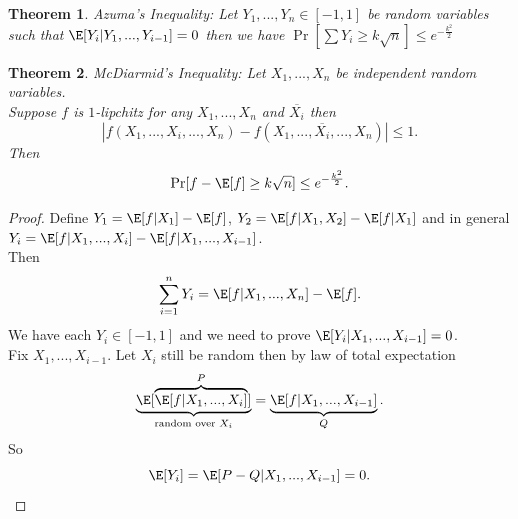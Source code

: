 \documentclass[a4paper]{article}
\newtheorem{thm}{Theorem}[section]
\begin{document}
\begin{thm}
    Azuma's Inequality: Let $Y_1,...,Y_n\in [-1,1]$ be random variables such that $\E[Y_i | Y_1,...,Y_{i-1}]=0$ then we have $\Pr[\sum Y_i \geq k\sqrt{n}]\leq e^{-\frac{k^2}{2}}$ 
\end{thm}
\begin{thm}
    McDiarmid's Inequality: Let $X_1,...,X_n$ be independent random variables. \\
    Suppose $f$ is $1$-lipchitz for any $X_1,...,X_n$ and $\overline{X_i}$ then \[
    |f(X_1,...,X_i,...,X_n)-f(X_1,...,\overline{X_i},...,X_n)|\leq 1
    .\] 
    Then \[
    \Pr[f-\E[f]\geq k\sqrt{n}]\leq e^{-\frac{k^2}{2}}
    .\] 
\end{thm}
\begin{proof}
    Define $Y_1=\E[f|X_1]-\E[f]$, $Y_2=\E[f|X_1,X_2]-\E[f|X_1]$ and in general $Y_i=\E[f|X_1,...,X_i]-\E[f|X_1,...,X_{i-1}]$. \\
    Then \[
    \sum_{i=1}^n Y_i=\E[f|X_1,...,X_n]-\E[f]
    .\] 
    We have each $Y_i\in [-1,1]$ and we need to prove $\E[Y_i | X_1,...,X_{i-1}]=0$. \\
    Fix $X_1,...,X_{i-1}$. Let $X_i$ still be random then by law of total expectation \[
    \underbrace{\E[\overbrace{\E[f | X_1,...,X_i]}^{P}]}_{\text{random over $X_i$}}=\underbrace{\E[f| X_1,...,X_{i-1}]}_{Q}
    .\] 
    So \[
    \E[Y_i]=\E[P-Q | X_1,...,X_{i-1}]=0
    .\] 
\end{proof}
\newpage
\end{document}
